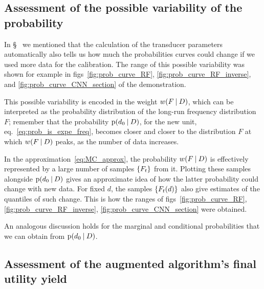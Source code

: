 \documentclass[\ifafour a4paper,12pt,\else a5paper,10pt,\fi%
onecolumn,oneside,article,%
british%
]{memoir}
\makeatletter
\newcommand*{\widefbox}[1]{\fbox{\hspace{1em}#1\hspace{1em}}}
\theoremstyle{remark}
\theoremstyle{innote}
\def\sum{\DOTSI\sumop\slimits@}
\newcommand*{\wrench}{{\fontencoding{U}\fontfamily{fontawesomethree}\selectfont\symbol{114}}}
\newcommand{\mynotew}[1]{{\footnotesize\color{notecolour}\wrench\ #1}}
\newcommand*{\de}{\partialup}%
\DeclarePairedDelimiter\set{\{}{\}} %
\newcommand*{\p}{\mathrm{p}}%
\renewcommand*{\|}[1][]{\nonscript\:#1\vert\nonscript\:\mathopen{}}
\newcommand*{\sect}{\S}%
\newcommand*{\eqn}{eq.}%
\newcommand*{\figs}{figs}%
\newcommand*{\tsum}{\mathop{\textstyle\sum}\nolimits}
\newcommand*{\wf}{w}
\makeatother
\begin{document}
\subsection{Assessment of the possible variability of the probability}
\label{sec:variability_prob}

In \sect\mynotew{} we mentioned that the calculation of the transducer parameters automatically also tells us how much the probabilities curves could change if we used more data for the calibration. The range of this possible variability was shown for example in \figs~\ref{fig:prob_curve_RF}, \ref{fig:prob_curve_RF_inverse}, and \ref{fig:prob_curve_CNN_section} of the demonstration.

This possible variability is encoded in the weight $\wf(F \| D)$, which can be interpreted as the probability distribution of the long-run frequency distribution $F$; remember that the probability $\p(d_{0} \| D)$, for the new unit, \eqn~\eqref{eq:prob_is_expe_freq}, becomes closer and closer to the distribution $F$ at which $\wf(F \| D)$ peaks, as the number of data increases.

In the approximation~\eqref{eq:MC_approx}, the probability $\wf(F \| D)$ is effectively represented by a large number of samples $\set{F_{t}}$ from it. Plotting these samples alongside $\p(d_{0} \| D)$ gives an approximate idea of how the latter probability could change with new data. For fixed $d$, the samples $\set{F_{t}(d)}$  also give estimates of the quantiles of such change. This is how the ranges of \figs~\ref{fig:prob_curve_RF}, \ref{fig:prob_curve_RF_inverse}, \ref{fig:prob_curve_CNN_section} were obtained.

An analogous discussion holds for the marginal and conditional probabilities that we can obtain from $\p(d_{0} \| D)$.


\subsection{Assessment of the augmented algorithm's final utility yield}
\label{sec:algorithm_yield}




\end{document}

